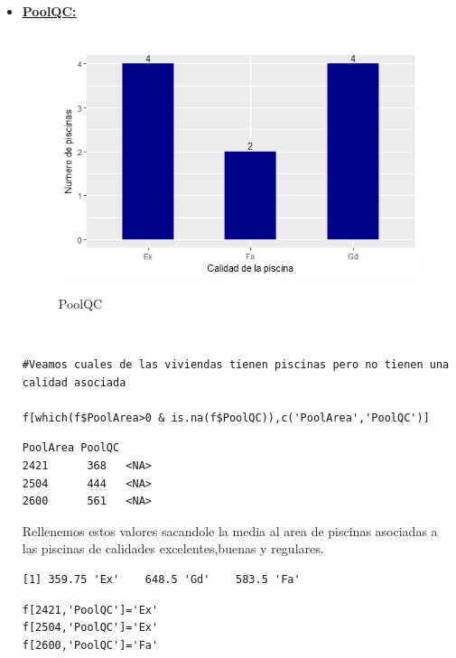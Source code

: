 \documentclass{report}
\begin{document}
\begin{itemize}
\begin{itemize}
\begin{itemize}
\item[2.1] \textbf{\underline{PoolQC:}}\\ \\
\begin{figure}[h]
	\centering
	\includegraphics[scale=0.8]{Piscina.JPEG}
	\label{p1}
	\caption{PoolQC}
\end{figure} \\

\begin{lstlisting}[frame=single]
#Veamos cuales de las viviendas tienen piscinas pero no tienen una calidad asociada

f[which(f$PoolArea>0 & is.na(f$PoolQC)),c('PoolArea','PoolQC')]
\end{lstlisting}

\begin{lstlisting}[frame=single]
      PoolArea PoolQC
2421      368   <NA>
2504      444   <NA>
2600      561   <NA>
\end{lstlisting}
\vspace{2mm}

Rellenemos estos valores sacandole la media al area de piscinas asociadas a las piscinas de calidades excelentes,buenas y regulares.\\

\begin{lstlisting}[frame=single]
[1] 359.75 'Ex'    648.5 'Gd'    583.5 'Fa'
\end{lstlisting}

\begin{lstlisting}[frame=single]
f[2421,'PoolQC']='Ex'
f[2504,'PoolQC']='Ex'
f[2600,'PoolQC']='Fa'
\end{lstlisting}


\end{itemize}
\end{itemize}
\end{itemize}
\end{document}
